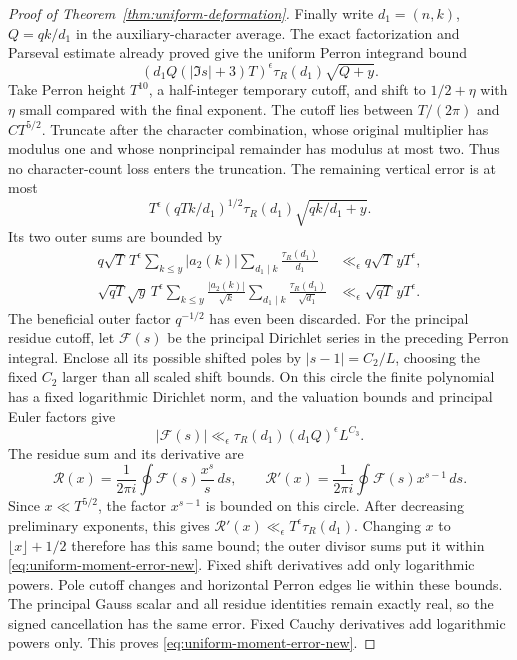 \begin{proof}[Proof of Theorem~\ref{thm:uniform-deformation}]
Finally write $d_1=(n,k)$, $Q=qk/d_1$ in the auxiliary-character
average. The exact factorization and Parseval estimate already
proved give the uniform Perron integrand bound
\[
 (d_1Q(|\Im s|+3)T)^\epsilon\tau_R(d_1)\sqrt{Q+y}.
\]
Take Perron height $T^{10}$, a half-integer temporary cutoff, and
shift to $1/2+\eta$ with $\eta$ small compared with the final
exponent. The cutoff lies between $T/(2\pi)$ and $CT^{5/2}$.
Truncate after the character combination, whose original multiplier
has modulus one and whose nonprincipal remainder has modulus at
most two. Thus no character-count loss enters the truncation.
The remaining vertical error is at most
\[
 T^\epsilon(qTk/d_1)^{1/2}\tau_R(d_1)\sqrt{qk/d_1+y}.
\]
Its two outer sums are bounded by
\begin{align*}
 q\sqrt T\,T^\epsilon
 \sum_{k\le y}|a_2(k)|\sum_{d_1\mid k}\frac{\tau_R(d_1)}{d_1}
                       &\ll_\epsilon q\sqrt T\,yT^\epsilon,\\
 \sqrt{qT}\sqrt y\,T^\epsilon
 \sum_{k\le y}\frac{|a_2(k)|}{\sqrt k}
       \sum_{d_1\mid k}\frac{\tau_R(d_1)}{\sqrt{d_1}}
                       &\ll_\epsilon\sqrt{qT}\,yT^\epsilon.
\end{align*}
The beneficial outer factor $q^{-1/2}$ has even been discarded.
For the principal residue cutoff, let $\mathcal F(s)$ be the
principal Dirichlet series in the preceding Perron integral.
Enclose all its possible shifted poles by $|s-1|=C_2/L$, choosing
the fixed $C_2$ larger than all scaled shift bounds. On this circle
the finite polynomial has a fixed logarithmic Dirichlet norm,
and the valuation bounds and principal Euler factors give
\[
 |\mathcal F(s)|\ll_\epsilon
       \tau_R(d_1)(d_1Q)^\epsilon L^{C_3}.
\]
The residue sum and its derivative are
\[
 \mathcal R(x)=\frac1{2\pi i}\oint\mathcal F(s)\frac{x^s}{s}\,ds,
 \qquad
 \mathcal R'(x)=\frac1{2\pi i}\oint\mathcal F(s)x^{s-1}\,ds.
\]
Since $x\ll T^{5/2}$, the factor $x^{s-1}$ is bounded on this
circle. After decreasing preliminary exponents, this gives
$\mathcal R'(x)\ll_\epsilon T^\epsilon\tau_R(d_1)$.
Changing $x$ to $\lfloor x\rfloor+1/2$ therefore has this same
bound; the outer divisor sums put it within
\eqref{eq:uniform-moment-error-new}. Fixed shift derivatives add
only logarithmic powers.
Pole cutoff changes and horizontal Perron edges lie within these
bounds. The principal Gauss scalar and all residue identities remain
exactly real, so the signed cancellation has the same error.
Fixed Cauchy derivatives add logarithmic powers only. This proves
\eqref{eq:uniform-moment-error-new}.


\end{proof}
